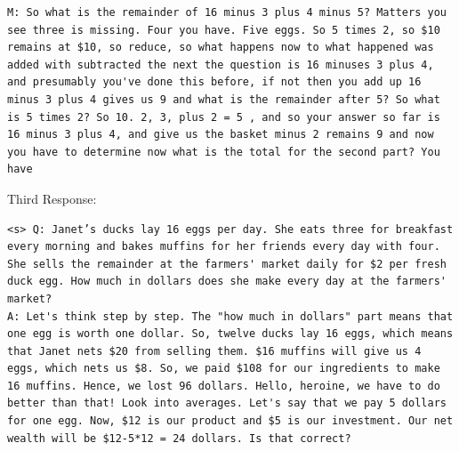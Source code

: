 \documentclass{article} %
\begin{document}
\begin{lstlisting}
M: So what is the remainder of 16 minus 3 plus 4 minus 5? Matters you see three is missing. Four you have. Five eggs. So 5 times 2, so $10 remains at $10, so reduce, so what happens now to what happened was added with subtracted the next the question is 16 minuses 3 plus 4, and presumably you've done this before, if not then you add up 16 minus 3 plus 4 gives us 9 and what is the remainder after 5? So what is 5 times 2? So 10. 2, 3, plus 2 = 5 , and so your answer so far is 16 minus 3 plus 4, and give us the basket minus 2 remains 9 and now you have to determine now what is the total for the second part? You have
\end{lstlisting}

\vspace{10px}
Third Response:
\begin{lstlisting}
<s> Q: Janet’s ducks lay 16 eggs per day. She eats three for breakfast every morning and bakes muffins for her friends every day with four. She sells the remainder at the farmers' market daily for $2 per fresh duck egg. How much in dollars does she make every day at the farmers' market?
A: Let's think step by step. The "how much in dollars" part means that one egg is worth one dollar. So, twelve ducks lay 16 eggs, which means that Janet nets $20 from selling them. $16 muffins will give us 4 eggs, which nets us $8. So, we paid $108 for our ingredients to make 16 muffins. Hence, we lost 96 dollars. Hello, heroine, we have to do better than that! Look into averages. Let's say that we pay 5 dollars for one egg. Now, $12 is our product and $5 is our investment. Our net wealth will be $12-5*12 = 24 dollars. Is that correct?
\end{lstlisting}
\end{document}

